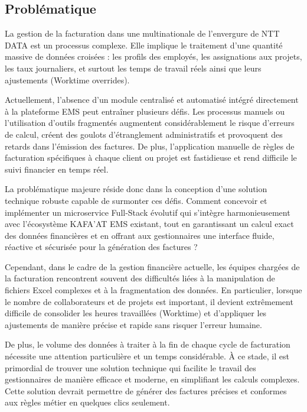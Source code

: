 \documentclass[12pt, a4paper, openany]{report}
\begin{document}
\vspace{0.2cm}

\subsection{Problématique}

\vspace{-0.4cm}
La gestion de la facturation dans une multinationale de l'envergure de NTT DATA est un processus complexe. Elle implique le traitement d'une quantité massive de données croisées : les profils des employés, les assignations aux projets, les taux journaliers, et surtout les temps de travail réels ainsi que leurs ajustements (Worktime overrides).

Actuellement, l'absence d'un module centralisé et automatisé intégré directement à la plateforme EMS peut entraîner plusieurs défis. Les processus manuels ou l'utilisation d'outils fragmentés augmentent considérablement le risque d'erreurs de calcul, créent des goulots d'étranglement administratifs et provoquent des retards dans l'émission des factures. De plus, l'application manuelle de règles de facturation spécifiques à chaque client ou projet est fastidieuse et rend difficile le suivi financier en temps réel.

La problématique majeure réside donc dans la conception d'une solution technique robuste capable de surmonter ces défis. Comment concevoir et implémenter un microservice Full-Stack évolutif qui s'intègre harmonieusement avec l'écosystème KAFA'AT EMS existant, tout en garantissant un calcul exact des données financières et en offrant aux gestionnaires une interface fluide, réactive et sécurisée pour la génération des factures ?

Cependant, dans le cadre de la gestion financière actuelle, les équipes chargées de la facturation rencontrent souvent des difficultés liées à la manipulation de fichiers Excel complexes et à la fragmentation des données. En particulier, lorsque le nombre de collaborateurs et de projets est important, il devient extrêmement difficile de consolider les heures travaillées (Worktime) et d'appliquer les ajustements de manière précise et rapide sans risquer l'erreur humaine.

De plus, le volume des données à traiter à la fin de chaque cycle de facturation nécessite une attention particulière et un temps considérable. À ce stade, il est primordial de trouver une solution technique qui facilite le travail des gestionnaires de manière efficace et moderne, en simplifiant les calculs complexes. Cette solution devrait permettre de générer des factures précises et conformes aux règles métier en quelques clics seulement.
\end{document}
